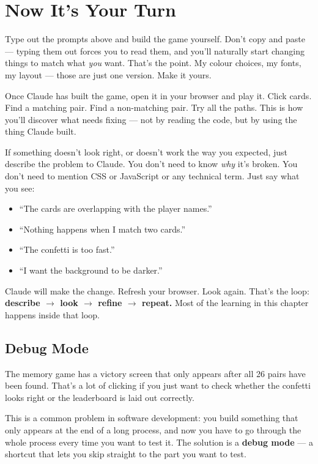 \documentclass[11pt,a4paper]{article}
\begin{document}
\section{Now It's Your Turn}

Type out the prompts above and build the game yourself. Don't copy and paste --- typing them out forces you to read them, and you'll naturally start changing things to match what \emph{you} want. That's the point. My colour choices, my fonts, my layout --- those are just one version. Make it yours.

Once Claude has built the game, open it in your browser and play it. Click cards. Find a matching pair. Find a non-matching pair. Try all the paths. This is how you'll discover what needs fixing --- not by reading the code, but by using the thing Claude built.

If something doesn't look right, or doesn't work the way you expected, just describe the problem to Claude. You don't need to know \emph{why} it's broken. You don't need to mention CSS or JavaScript or any technical term. Just say what you see:

\begin{itemize}[leftmargin=1.5em]
  \item ``The cards are overlapping with the player names.''
  \item ``Nothing happens when I match two cards.''
  \item ``The confetti is too fast.''
  \item ``I want the background to be darker.''
\end{itemize}

Claude will make the change. Refresh your browser. Look again. That's the loop: \textbf{describe \(\rightarrow\) look \(\rightarrow\) refine \(\rightarrow\) repeat.} Most of the learning in this chapter happens inside that loop.

\subsection{Debug Mode}

The memory game has a victory screen that only appears after all 26 pairs have been found. That's a lot of clicking if you just want to check whether the confetti looks right or the leaderboard is laid out correctly.

This is a common problem in software development: you build something that only appears at the end of a long process, and now you have to go through the whole process every time you want to test it. The solution is a \textbf{debug mode} --- a shortcut that lets you skip straight to the part you want to test.
\end{document}
